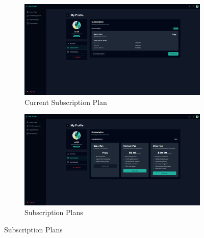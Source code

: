 \documentclass[12pt,a4paper,twoside]{book}
\begin{document}
\begin{figure}[H]
    \centering
    \begin{subfigure}[b]{0.48\textwidth}
        \centering
        \includegraphics[width=\textwidth,height=0.4\textheight,keepaspectratio]{Resources/Final UI/subscritpion.png}
        \caption{Current Subscription Plan}\label{fig:subscription-screen}
    \end{subfigure}
    \hfill
    \begin{subfigure}[b]{0.48\textwidth}
        \centering
        \includegraphics[width=\textwidth,height=0.4\textheight,keepaspectratio]{Resources/Final UI/subscription-2.png}
        \caption{Subscription Plans}\label{fig:subscription-plans-screen}
    \end{subfigure}
\end{figure}
\end{document}
